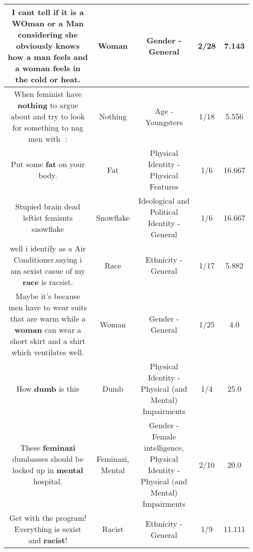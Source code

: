 \documentclass[11pt]{article}
\newlength\mylength
\begin{document}
\begin{center}
\begin{longtable}{|C{.65\mylength}|C{.30\mylength}|C{.12\mylength}|C{.12\mylength}|C{.12\mylength}|}
  \small I cant tell if it is a \textbf{WOman} or a Man considering she obviously knows how a man feels and a \textbf{woman} feels in the cold or heat.\normalsize   & Woman & Gender - General & 2/28 & 7.143 \\  \hline
  \small When feminist have \textbf{nothing} to argue about and try to look for something to nag men with 👀:\normalsize   & Nothing & Age - Youngsters & 1/18 & 5.556 \\  \hline
  \small Put some \textbf{fat} on your body.\normalsize   & Fat & Physical Identity - Physical Features & 1/6 & 16.667 \\  \hline
  \small Stupied brain dead leftist femisnts snowflake\normalsize   & Snowflake &  Ideological and Political Identity - General & 1/6 & 16.667 \\  \hline
  \small well i identify as a Air Conditioner.saying i am sexist casue of my \textbf{race} is racsist.\normalsize   & Race & Ethnicity - General & 1/17 & 5.882 \\  \hline
  \small Maybe it's because men have to wear suits that are warm while a \textbf{woman} can wear a short skirt and a shirt which ventilates well.\normalsize   & Woman & Gender - General & 1/25 & 4.0 \\  \hline
  \small How \textbf{dumb} is this\normalsize   & Dumb & Physical Identity - Physical (and Mental) Impairments & 1/4 & 25.0 \\  \hline
  \small These \textbf{feminazi} dumbasses should be locked up in \textbf{mental} hospital.\normalsize   & Feminazi, Mental & Gender - Female intelligence, Physical Identity - Physical (and Mental) Impairments & 2/10 & 20.0 \\  \hline
  \small Get with the program! Everything is sexist and \textbf{racist}!\normalsize   & Racist & Ethnicity - General & 1/9 & 11.111 \\  \hline

\end{longtable}
\end{center}
\end{document}
